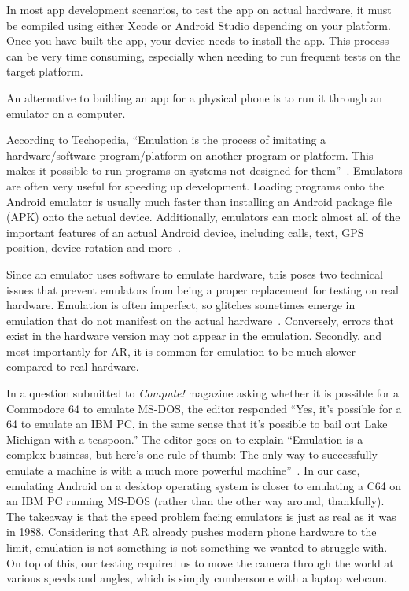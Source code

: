 \documentclass[a4paper, 10pt, american, titlepage]{article}
\begin{document}
In most app development scenarios, to test the app on actual hardware, it must
be compiled using either Xcode or Android Studio depending on your platform.
Once you have built the app, your device needs to install the app. This process
can be very time consuming, especially when needing to run frequent tests on
the target platform.

An alternative to building an app for a physical phone is to run it through an
emulator on a computer.

According to Techopedia, ``Emulation is the process of imitating a
hardware/software program/platform on another program or platform. This makes
it possible to run programs on systems not designed for
them''~\autocite{techopedia2019}. Emulators are often very useful for speeding
up development. Loading programs onto the Android emulator is usually much
faster than installing an Android package file (APK) onto the actual device.
Additionally, emulators can mock almost all of the important features of an
actual Android device, including calls, text, GPS position, device rotation and
more~\autocite{androidemulator}.

Since an emulator uses software to emulate hardware, this poses two technical
issues that prevent emulators from being a proper replacement for testing on
real hardware. Emulation is often imperfect, so glitches sometimes emerge in
emulation that do not manifest on the actual hardware~\autocite{alzaylaee2017}.
Conversely, errors that exist in the hardware version may not appear in the
emulation. Secondly, and most importantly for AR, it is common for emulation to
be much slower compared to real hardware.

In a question submitted to \textit{Compute!} magazine asking whether it is
possible for a Commodore 64 to emulate MS-DOS, the editor responded ``Yes, it's
possible for a 64 to emulate an IBM PC, in the same sense that it's possible to
bail out Lake Michigan with a teaspoon.'' The editor goes on to explain
``Emulation is a complex business, but here's one rule of thumb: The only way
to successfully emulate a machine is with a much more powerful
machine''~\autocite{warick1988}. In our case, emulating Android on a desktop
operating system is closer to emulating a C64 on an IBM PC running MS-DOS
(rather than the other way around, thankfully). The takeaway is that the speed
problem facing emulators is just as real as it was in 1988. Considering that AR
already pushes modern phone hardware to the limit, emulation is not something
is not something we wanted to struggle with. On top of this, our testing
required us to move the camera through the world at various speeds and angles,
which is simply cumbersome with a laptop webcam.
\end{document}
